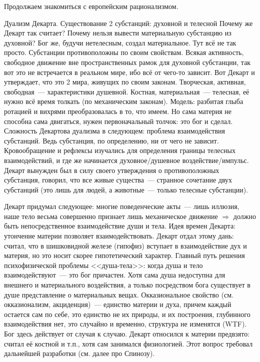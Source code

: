 Продолжаем знакомиться с европейским рационализмом.

Дуализм Декарта. Существование 2 субстанций: духовной и телесной
Почему же Декарт так считает? Почему нельзя вывести материальную субстанцию из духовной? Бог же, будучи нетелесным, создал материальное. Тут всё не так просто. Субстанции противоположны по своим свойствам. Всякая активность, свободное движение вне пространственных рамок для духовной субстанции, так вот это не встречается в реальном мире, ибо всё от чего-то зависит. Вот Декарт и утверждает, что это 2 мира, живущих по своим законам. Творческая, активная, свободная~--- характеристики душевной. Костная, материальная~--- телесная, её нужно всё время толкать (по механическим законам). Модель: разбитая глыба ротацией и вихрями преобразовалась в то, что имеем. Но сама материя не способна сама двигаться, нужен первоначальный толчок: это бог и сделал. 
Сложность Декартова дуализма в следующем: проблема взаимодействия субстанций. Ведь субстанция, по определению, ни от чего не зависит. Кровообращение и рефлексы изучались для определения границы телесных взаимодействий, и где же начинается духовное/душевное воздействие/импульс. Декарт вынужден был в силу своего утверждения о противоположных субстанция, говорил, что все живые существа~--- странное сочетание двух субстанций (это лишь для людей, а животные~--- только телесные субстанции). 

Декарт придумал следующее:
многие поведенческие акты~--- лишь иллюзия, наше тело весьма совершенно
признает лишь механическое движение $\Rightarrow$ должно быть непосредственное взаимодействие души и тела. Идея времен Декарта: утончение материи позволяет взаимодействовать. Декарт отдал этому дань: считал, что в шишковидной железе (гипофиз) вступает в взаимодействие дух и материя, но это носит скорее гипотетический характер. Главный путь решения психофизической проблемы <<душа-тела>>: когда душа и тело взаимодействуют~--- это бог причастен. Хотя сама душа недоступна для внешнего и материального воздействия, а только посредством бога существует в душе представление о материальных вещах. Окказиональное свойство (см. окказионализм, акциденция)~--- единство материи и духа, причем каждый остается сам по себе, это единство не их природы, и их построения, глубинного взаимодействия нет, это случайно и временно, структура не изменятся (WTF). Бог здесь действует от случая к случаю. Декарт относился к материи предвзято: считал её костной и т.п., хотя сам занимался физиологией. Этот вопрос требовал дальнейшей разработки (см. далее про Спинозу).


